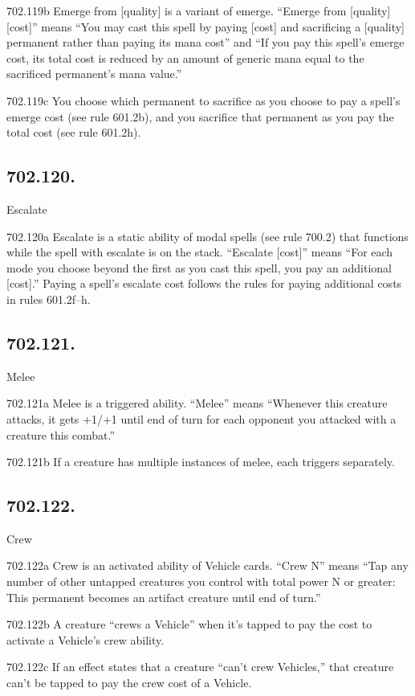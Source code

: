 702.119b Emerge from [quality] is a variant of emerge. “Emerge from [quality] [cost]” means “You may cast this spell by paying [cost] and sacrificing a [quality] permanent rather than paying its mana cost” and “If you pay this spell’s emerge cost, its total cost is reduced by an amount of generic mana equal to the sacrificed permanent’s mana value.”

702.119c You choose which permanent to sacrifice as you choose to pay a spell’s emerge cost (see rule 601.2b), and you sacrifice that permanent as you pay the total cost (see rule 601.2h).

\subsection*{702.120.}
Escalate

702.120a Escalate is a static ability of modal spells (see rule 700.2) that functions while the spell with escalate is on the stack. “Escalate [cost]” means “For each mode you choose beyond the first as you cast this spell, you pay an additional [cost].” Paying a spell’s escalate cost follows the rules for paying additional costs in rules 601.2f–h.

\subsection*{702.121.}
Melee

702.121a Melee is a triggered ability. “Melee” means “Whenever this creature attacks, it gets +1/+1 until end of turn for each opponent you attacked with a creature this combat.”

702.121b If a creature has multiple instances of melee, each triggers separately.

\subsection*{702.122.}
Crew

702.122a Crew is an activated ability of Vehicle cards. “Crew N” means “Tap any number of other untapped creatures you control with total power N or greater: This permanent becomes an artifact creature until end of turn.”

702.122b A creature “crews a Vehicle” when it’s tapped to pay the cost to activate a Vehicle’s crew ability.

702.122c If an effect states that a creature “can’t crew Vehicles,” that creature can’t be tapped to pay the crew cost of a Vehicle.


